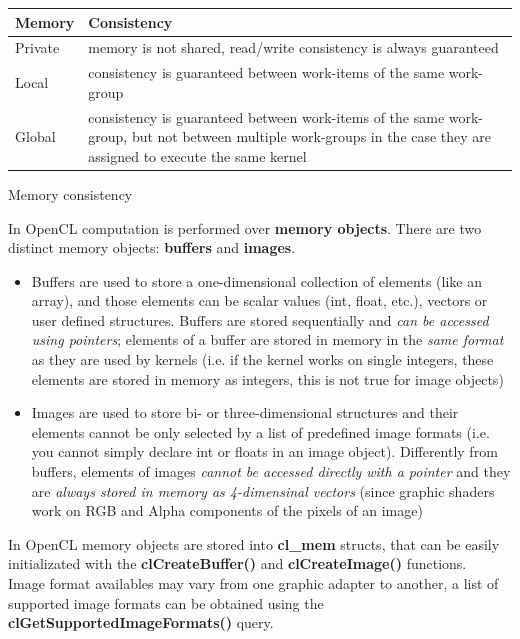 \begin{tablehere}
{\footnotesize
\begin{tabular}{|p{2cm}|p{}|} \hline
\textbf{Memory} & \textbf{Consistency}\\ \hline
Private & memory is not shared, read/write consistency is always guaranteed\\ \hline
Local & consistency is guaranteed between work-items of the same work-group\\ \hline
Global & consistency is guaranteed between work-items of the same work-group, but not between multiple work-groups in the case they are assigned to execute the same kernel\\ \hline
\end{tabular}}
\caption{Memory consistency}
\label{tab:memconsistency}
\end{tablehere}


In OpenCL computation is performed over \textbf{memory objects}. There are two distinct memory objects: \textbf{buffers} and \textbf{images}.

\begin{itemize}
	\item Buffers are used to store a one-dimensional collection of elements (like an array), and those elements can be scalar values (int, float, etc.), vectors or user defined structures.
	Buffers are stored sequentially and \emph{can be accessed using pointers}; elements of a buffer are stored in memory in the \emph{same format} as they are used by kernels (i.e. if the kernel works on single integers, these elements are stored in memory as integers, this is not true for image objects)
	\item Images are used to store bi- or three-dimensional structures and their elements cannot be only selected by a list of predefined image formats (i.e. you cannot simply declare int or floats in an image object). Differently from buffers, elements of images \emph{cannot be accessed directly with a pointer} and they are \emph{always stored in memory as 4-dimensinal vectors} (since graphic shaders work on RGB and Alpha components of the pixels of an image)
\end{itemize}

\begin{CLCode}
In OpenCL memory objects are stored into \textbf{cl\_mem} structs, that can be easily initializated with the \textbf{clCreateBuffer()} and \textbf{clCreateImage()} functions.\\
Image format availables may vary from one graphic adapter to another, a list of supported image formats can be obtained using the \textbf{clGetSupportedImageFormats()} query.
\end{CLCode}

















